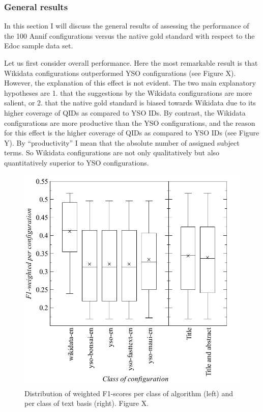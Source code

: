 \hypertarget{general-results}{%
\subsubsection{General results}\label{general-results}}

In this section I will discuss the general results of assessing the
performance of the 100 Annif configurations versus the native gold
standard with respect to the Edoc sample data set.

Let us first consider overall performance. Here the most remarkable
result is that Wikidata configurations outperformed YSO configurations
(see Figure X). However, the explanation of this effect is not evident.
The two main explanatory hypotheses are 1. that the suggestions by the
Wikidata configurations are more salient, or 2. that the native gold
standard is biased towards Wikidata due to its higher coverage of QIDs
as compared to YSO IDs. By contrast, the Wikidata configurations are
more productive than the YSO configurations, and the reason for this
effect is the higher coverage of QIDs as compared to YSO IDs (see Figure
Y). By ``productivity'' I mean that the absolute number of assigned
subject terms. So Wikidata configurations are not only qualitatively but
also quantitatively superior to YSO configurations.

\begin{figure}
\centering
\includegraphics{images/metrics_all_project+abstract.pdf}
\caption{Distribution of weighted F1-scores per class of algorithm
(left) and per class of text basis (right). Figure X.}
\end{figure}

